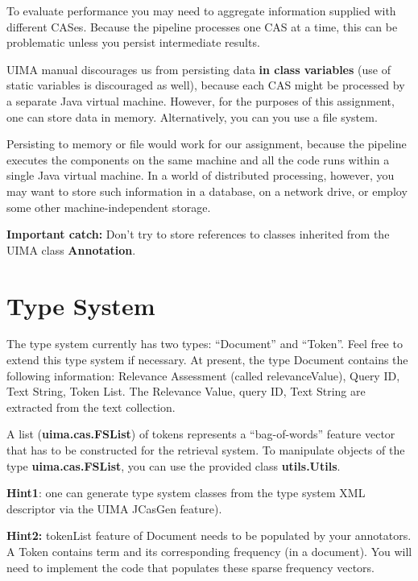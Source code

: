 \documentclass[oneside,11pt]{memoir}
\begin{document}
To evaluate performance you may need to aggregate information
supplied with different CASes.
Because the pipeline processes one CAS at a time,
this can be problematic unless you persist intermediate results.

UIMA manual discourages us from persisting data \textbf{in class variables} (use 
of static variables is discouraged as well),
because each CAS might be processed by a separate Java virtual machine.
However, for the purposes of this assignment, one can store data in memory.
Alternatively, you can you use a file system.

Persisting to memory or file would work for our assignment, 
because the pipeline executes the components on the same machine 
and all the code runs within a single Java virtual machine.
In a world of distributed processing, however, you may want to store such information in a database,
on a network drive, or employ some other machine-independent storage.

\textbf{Important catch:} Don't try to store references to classes inherited from the
UIMA class \textbf{Annotation}.

\vspace{2em}
\section{Type System}\label{SectionType}
The type system currently has two types: ``Document'' and ``Token''.
Feel free to extend this type system if necessary.
At present, the type Document contains the following information: Relevance Assessment (called relevanceValue), Query ID, Text String, Token
List. The Relevance Value, query ID, Text String are extracted from the text collection. 

A list (\textbf{uima.cas.FSList}) of tokens 
represents a ``bag-of-words'' feature vector
that has to be constructed for the retrieval system. 
To manipulate objects of the type \textbf{uima.cas.FSList},
you can use the provided class \textbf{utils.Utils}.

\textbf{Hint1}:
one can generate type system classes from the type system XML descriptor via the UIMA JCasGen feature).

\textbf{Hint2:} tokenList feature of Document needs to be populated by your annotators. 
A Token contains term and its corresponding frequency (in a document). 
You will need to implement the code that populates these sparse frequency vectors.


\end{document}
